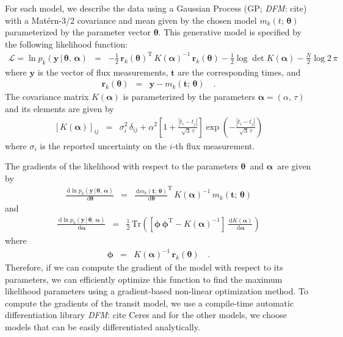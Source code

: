 \documentclass[onecolumn]{aastex6}
\newcommand{\T}{\ensuremath{\mathrm{T}}}
\newcommand{\dd}{\ensuremath{\,\mathrm{d}}}
\newcommand{\bvec}[1]{{\ensuremath{\boldsymbol{#1}}}}
\newcommand{\todo}[3]{{\color{#2}\emph{#1}: #3}}
\newcommand{\dfmtodo}[1]{\todo{DFM}{red}{#1}}
\newcommand{\meanpars}{{\ensuremath{\bvec{\theta}}}}
\newcommand{\kernpars}{{\ensuremath{\bvec{\alpha}}}}
\begin{document}
For each model, we describe the data using a Gaussian Process (GP;
\dfmtodo{cite}) with a Mat\'ern-3/2 covariance and mean given by the chosen
model $m_k(t;\,\meanpars)$ parameterized by the parameter vector \meanpars.
This generative model is specified by the following likelihood function:
\begin{eqnarray}
\mathcal{L} = \ln p_k(\bvec{y}\,|\,\meanpars,\,\kernpars) &=&
- \frac{1}{2}\,\bvec{r}_k(\meanpars)^\T\,K(\kernpars)^{-1}\,
    \bvec{r}_k(\meanpars)
- \frac{1}{2}\log\det K(\kernpars) - \frac{N}{2} \log{2\,\pi}
\end{eqnarray}
where \bvec{y} is the vector of flux measurements, \bvec{t} are the
corresponding times, and
\begin{eqnarray}
\bvec{r}_k(\meanpars) &=& \bvec{y} - m_k(\bvec{t};\,\meanpars) \quad.
\end{eqnarray}
The covariance matrix $K(\kernpars)$ is parameterized by the parameters
$\kernpars = (\alpha,\,\tau)$ and its elements are given by
\begin{eqnarray}
\left[ K(\kernpars) \right]_{ij} &=& \sigma_i^2\,\delta_{ij}
    + \alpha^2 \left[ 1+\frac{|t_i - t_j|}{\sqrt{3}\,\tau} \right]
      \exp \left(-\frac{|t_i - t_j|}{\sqrt{3}\,\tau}\right)
\end{eqnarray}
where $\sigma_i$ is the reported uncertainty on the $i$-th flux measurement.

The gradients of the likelihood with respect to the parameters \meanpars\
and \kernpars\ are given by
\begin{eqnarray}
\frac{\dd\ln p_k(\bvec{y}\,|\,\meanpars,\,\kernpars)}{\dd \meanpars} &=&
\frac{\dd m_k(\bvec{t};\,\meanpars)}{\dd\meanpars}^\T \, K(\kernpars)^{-1} \,
    m_k(\bvec{t};\,\meanpars)
\end{eqnarray}
and
\begin{eqnarray}
\frac{\dd\ln p_k(\bvec{y}\,|\,\meanpars,\,\kernpars)}{\dd \kernpars} &=&
\frac{1}{2}\,\mathrm{Tr}\left(
    \left[ \bvec{\phi}\,\bvec{\phi}^\T - K(\kernpars)^{-1} \right]
    \,\frac{\dd K(\kernpars)}{\dd\kernpars}
\right)
\end{eqnarray}
where
\begin{eqnarray}
\bvec{\phi} &=& K(\kernpars)^{-1}\,\bvec{r}_k(\meanpars) \quad.
\end{eqnarray}
Therefore, if we can compute the gradient of the model with respect to its
parameters, we can efficiently optimize this function to find the maximum
likelihood parameters using a gradient-based non-linear optimization method.
To compute the gradients of the transit model, we use a compile-time automatic
differentiation library \dfmtodo{cite Ceres} and for the other models, we
choose models that can be easily differentiated analytically.
\end{document}
